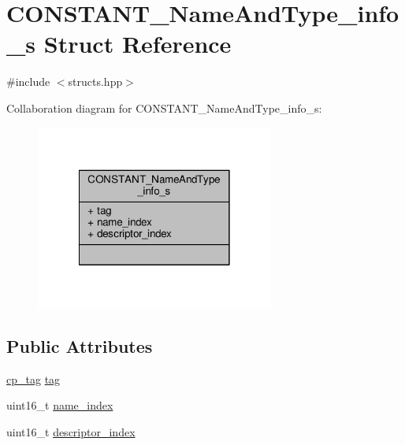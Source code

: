 \hypertarget{structCONSTANT__NameAndType__info__s}{\section{C\+O\+N\+S\+T\+A\+N\+T\+\_\+\+Name\+And\+Type\+\_\+info\+\_\+s Struct Reference}
\label{structCONSTANT__NameAndType__info__s}
}


{\ttfamily \#include $<$structs.\+hpp$>$}



Collaboration diagram for C\+O\+N\+S\+T\+A\+N\+T\+\_\+\+Name\+And\+Type\+\_\+info\+\_\+s\+:\nopagebreak
\begin{figure}[H]
\begin{center}
\leavevmode
\includegraphics[width=222pt]{structCONSTANT__NameAndType__info__s__coll__graph}
\end{center}
\end{figure}
\subsection*{Public Attributes}
\begin{DoxyCompactItemize}
\item 
\hyperlink{structs_8hpp_a17947ec3f3c1f2392eabd36c1ba5fec6}{cp\+\_\+tag} \hyperlink{structCONSTANT__NameAndType__info__s_af1309f9a1be5883b8fd62f0ddb624556}{tag}
\item 
uint16\+\_\+t \hyperlink{structCONSTANT__NameAndType__info__s_af552a69c9df4e87b43cc278ff6a21e51}{name\+\_\+index}
\item 
uint16\+\_\+t \hyperlink{structCONSTANT__NameAndType__info__s_a18a7d7ce834fbc08bbf856e0528e6383}{descriptor\+\_\+index}
\end{DoxyCompactItemize}


